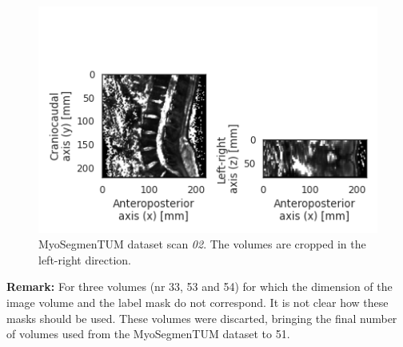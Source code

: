 \begin{figure}
    \centering
    \includegraphics[width=.95\textwidth]{automated_graphs/OSF_02.png}
    \caption{MyoSegmenTUM dataset scan \textit{02}. 
    The volumes are cropped in the left-right direction. 
    \label{fig:OSF_02}}
\end{figure}

\textbf{Remark:} For three volumes (nr 33, 53 and 54) for which the dimension of the image volume and the label mask do not correspond. 
It is not clear how these masks should be used. 
These volumes were discarted, bringing the final number of volumes used from the MyoSegmenTUM dataset to 51.